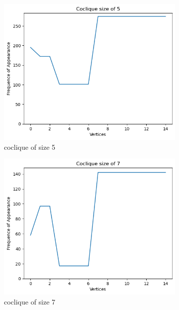 \documentclass{amsart}
\theoremstyle{definition}
\begin{document}
\begin{appendix}
\begin{figure}[hbt!]
\begin{subfigure}[b]{.45\textwidth}
			\centering
			\includegraphics[width=1\linewidth]{depth_4_size_5.png}
			\caption{coclique of size 5}
		\end{subfigure}
		\begin{subfigure}[b]{.45\textwidth}
			\centering
			\includegraphics[width=1\linewidth]{depth_4_size_7.png}
			\caption{coclique of size 7}
		\end{subfigure}
		\begin{subfigure}[b]{.45\textwidth}
			\centering

\end{subfigure}
\end{figure}
\end{appendix}
\end{document}
